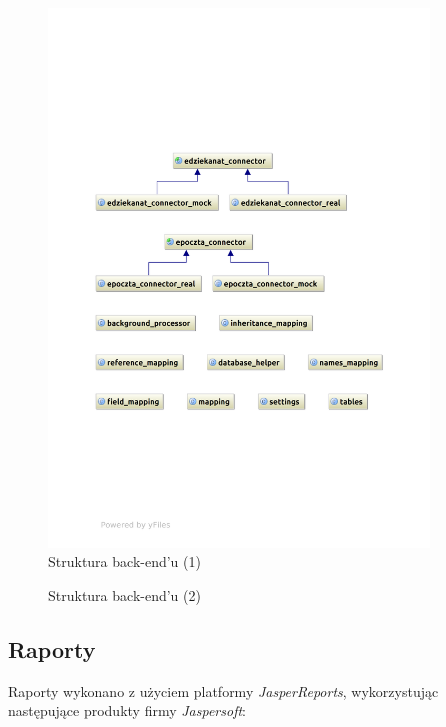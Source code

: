 \begin{figure}[H]
\begin{center}
\includegraphics[width=0.9\textwidth]{figures/lw/backend1.pdf} 
\end{center}
\caption{Struktura back-end'u (1)}\label{rys:back-end1}
\end{figure}

\newpage
\begin{figure}[H]
\begin{center}
 
\end{center}
\caption{Struktura back-end'u (2)}\label{rys:back-end2}
\end{figure}
\newpage

\subsection{Raporty}
Raporty wykonano z użyciem platformy \textit{JasperReports}, wykorzystując następujące produkty firmy \textit{Jaspersoft}:

